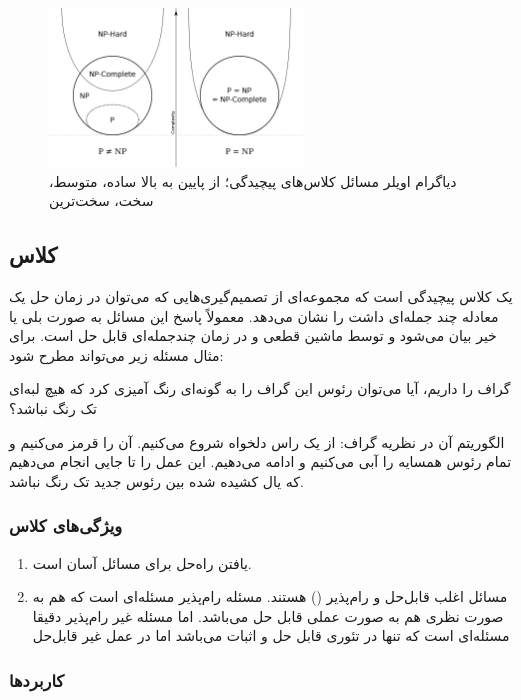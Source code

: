 \documentclass[a4paper]{article}
\begin{document}
\begin{figure}[H]
    \centering
    \includegraphics[width=0.6\textwidth]{images/euler_diagram.png}
        \caption{دیاگرام اویلر مسائل کلاس‌های پیچیدگی؛ از پایین به بالا ساده،
        متوسط، سخت، سخت‌ترین}
    \label{fig: uml}
\end{figure}

\subsection{کلاس }

 یک کلاس پیچیدگی است که مجموعه‌ای از تصمیم‌گیری‌هایی که می‌توان در زمان حل
یک معادله چند جمله‌ای داشت را نشان می‌دهد. معمولاً پاسخ این مسائل به صورت بلی یا
خیر بیان می‌شود و توسط ماشین قطعی و در زمان چندجمله‌ای قابل حل است. برای مثال
مسئله زیر می‌تواند مطرح شود:

گراف  را داریم، آیا می‌توان رئوس این گراف را به گونه‌ای رنگ آمیزی کرد که
هیچ لبه‌ای تک رنگ نباشد؟

الگوریتم آن در نظریه گراف: از یک راس دلخواه شروع می‌کنیم. آن را قرمز می‌کنیم و
تمام رئوس همسایه را آبی می‌کنیم و ادامه می‌دهیم. این عمل را تا جایی انجام
می‌دهیم که یال کشیده شده بین
رئوس جدید تک رنگ نباشد.

\subsubsection{ویژگی‌های کلاس }

\begin{enumerate}
    \item یافتن راه‌حل برای مسائل  آسان است.
    \item مسائل  اغلب قابل‌حل و رام‌پذیر () هستند. مسئله
    رام‌پذیر مسئله‌ای است که هم به صورت نظری هم به صورت عملی قابل حل می‌باشد.
    اما مسئله غیر رام‌پذیر دقیقا مسئله‌ای است که تنها در تئوری قابل حل و اثبات
    می‌باشد اما در عمل غیر قابل‌حل
\end{enumerate}

\subsubsection{کاربرد‌ها}
\end{document}
